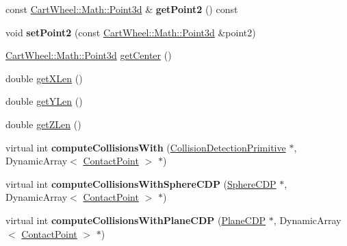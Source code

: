 \begin{DoxyCompactItemize}
\item 
\hypertarget{classCartWheel_1_1Physics_1_1BoxCDP_a028629fedb1b0256a7bb096f2ba0c532}{
const \hyperlink{classCartWheel_1_1Math_1_1Point3d}{CartWheel::Math::Point3d} \& {\bfseries getPoint2} () const }
\label{classCartWheel_1_1Physics_1_1BoxCDP_a028629fedb1b0256a7bb096f2ba0c532}

\item 
\hypertarget{classCartWheel_1_1Physics_1_1BoxCDP_aeee299492278d953d61eb163fee4399d}{
void {\bfseries setPoint2} (const \hyperlink{classCartWheel_1_1Math_1_1Point3d}{CartWheel::Math::Point3d} \&point2)}
\label{classCartWheel_1_1Physics_1_1BoxCDP_aeee299492278d953d61eb163fee4399d}

\item 
\hyperlink{classCartWheel_1_1Math_1_1Point3d}{CartWheel::Math::Point3d} \hyperlink{classCartWheel_1_1Physics_1_1BoxCDP_ac0818b982e4690ad1fb95f5c88ecb1a2}{getCenter} ()
\item 
double \hyperlink{classCartWheel_1_1Physics_1_1BoxCDP_ac8a41c6da69e379ab479e825b03cbcb3}{getXLen} ()
\item 
double \hyperlink{classCartWheel_1_1Physics_1_1BoxCDP_a3536b20411f1534c608f917cf950ba17}{getYLen} ()
\item 
double \hyperlink{classCartWheel_1_1Physics_1_1BoxCDP_aa6d43bb822464cf18cc8164dc2942c38}{getZLen} ()
\item 
\hypertarget{classCartWheel_1_1Physics_1_1BoxCDP_af808c33f168e8d9643f435f275dc08f6}{
virtual int {\bfseries computeCollisionsWith} (\hyperlink{classCartWheel_1_1Physics_1_1CollisionDetectionPrimitive}{CollisionDetectionPrimitive} $\ast$, DynamicArray$<$ \hyperlink{classCartWheel_1_1Physics_1_1ContactPoint}{ContactPoint} $>$ $\ast$)}
\label{classCartWheel_1_1Physics_1_1BoxCDP_af808c33f168e8d9643f435f275dc08f6}

\item 
\hypertarget{classCartWheel_1_1Physics_1_1BoxCDP_a19a07840821ab2f7640d7bdca66b95c5}{
virtual int {\bfseries computeCollisionsWithSphereCDP} (\hyperlink{classCartWheel_1_1Physics_1_1SphereCDP}{SphereCDP} $\ast$, DynamicArray$<$ \hyperlink{classCartWheel_1_1Physics_1_1ContactPoint}{ContactPoint} $>$ $\ast$)}
\label{classCartWheel_1_1Physics_1_1BoxCDP_a19a07840821ab2f7640d7bdca66b95c5}

\item 
\hypertarget{classCartWheel_1_1Physics_1_1BoxCDP_a89096c652855213aac1430edbe183eee}{
virtual int {\bfseries computeCollisionsWithPlaneCDP} (\hyperlink{classCartWheel_1_1Physics_1_1PlaneCDP}{PlaneCDP} $\ast$, DynamicArray$<$ \hyperlink{classCartWheel_1_1Physics_1_1ContactPoint}{ContactPoint} $>$ $\ast$)}
\label{classCartWheel_1_1Physics_1_1BoxCDP_a89096c652855213aac1430edbe183eee}


\end{DoxyCompactItemize}
